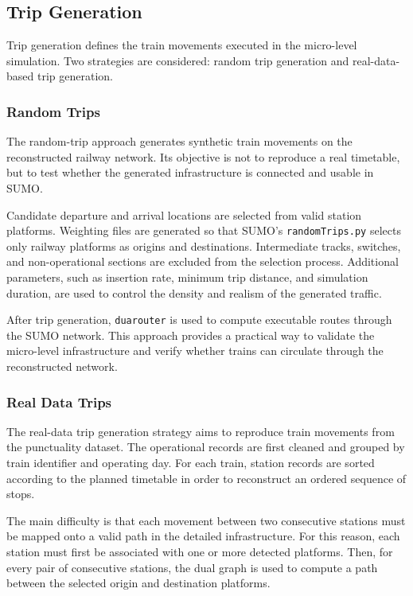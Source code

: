 \subsection{Trip Generation}
Trip generation defines the train movements executed in the micro-level simulation. 
Two strategies are considered: random trip generation and real-data-based trip generation.

\newpage

\subsubsection{Random Trips}
The random-trip approach generates synthetic train movements on the reconstructed railway network. Its objective is not 
to reproduce a real timetable, but to test whether the generated infrastructure is connected and usable in SUMO.\@

Candidate departure and arrival locations are selected from valid station platforms. Weighting files are generated so 
that SUMO’s \texttt{randomTrips.py} selects only railway platforms as origins and destinations. Intermediate tracks, 
switches, and non-operational sections are excluded from the selection process. Additional parameters, such as insertion 
rate, minimum trip distance, and simulation duration, are used to control the density and realism of the generated traffic.

After trip generation, \texttt{duarouter} is used to compute executable routes through the SUMO network. This approach 
provides a practical way to validate the micro-level infrastructure and verify whether trains can circulate through the 
reconstructed network.

\subsubsection{Real Data Trips}
The real-data trip generation strategy aims to reproduce train movements from the punctuality dataset. The operational 
records are first cleaned and grouped by train identifier and operating day. For each train, station records are sorted 
according to the planned timetable in order to reconstruct an ordered sequence of stops.

The main difficulty is that each movement between two consecutive stations must be mapped onto a valid path in the 
detailed infrastructure. For this reason, each station must first be associated with one or more detected platforms. Then, 
for every pair of consecutive stations, the dual graph is used to compute a path between the selected origin and 
destination platforms.

